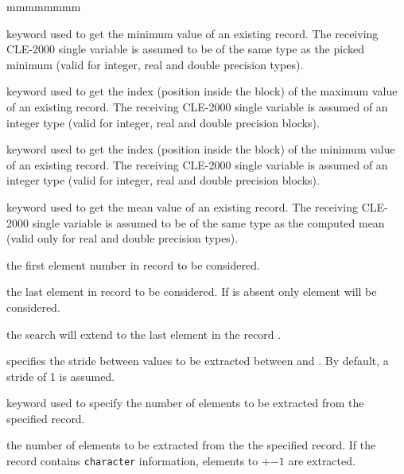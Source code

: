 \begin{ListeDeDescription}{mmmmmmmm}
\item[\moc{MINVAL}] keyword used to get the minimum value of an existing
record.
The receiving CLE-2000 single variable is assumed to be of the same type as the
picked minimum (valid for integer, real and double precision types).

\item[\moc{INDMAX}] keyword used to get the index (position inside the block)
of the maximum value of an existing
record.
The receiving CLE-2000 single variable is assumed of an integer type
(valid for integer, real and double precision blocks).

\item[\moc{INDMIN}] keyword used to get the index (position inside the block)
of the minimum value of an existing
record.
The receiving CLE-2000 single variable is assumed of an integer type
(valid for integer, real and double precision blocks).

\item[\moc{MEAN}] keyword used to get the mean value of an existing
record.
The receiving CLE-2000 single variable is assumed to be of the same type as the
computed mean (valid only for real and double precision types).

\item[\dusa{index1}] the first element number in record  to be
considered.

\item[\dusa{index2}] the last element in record  to be
considered. If  is absent only element  will be
considered.

\item[\moc{*}] the search will extend to the last
element in the record .

\item[\dusa{index3}] specifies the stride between
values to be extracted between  and . By default, a
stride of 1 is assumed.

\item[\moc{NVAL}] keyword used to specify the number of elements to be
extracted from the specified record.

\item[\dusa{neval}] the number of  elements to be extracted from
the the specified record. If the record contains {\tt character}
information, elements
 to
$+$$-1$ are extracted.

\end{ListeDeDescription}

